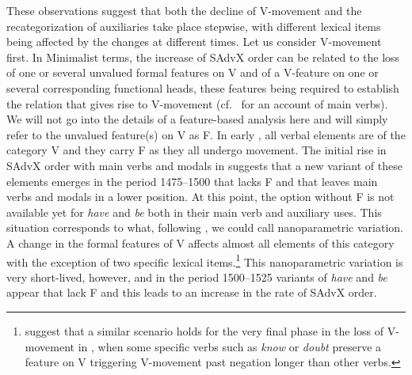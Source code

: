\documentclass[output=paper]{langsci/langscibook}
\begin{document}
These observations suggest that both the decline of V-movement and the
recategorization of auxiliaries take place stepwise, with different lexical
items being affected by the changes at different times. Let us consider
V-movement first. In Minimalist terms, the increase of SAdvX order can be
related to the loss of one or several unvalued formal features on V and of a
V-feature on one or several corresponding functional heads, these features
being required to establish the  relation that gives rise to V-movement
(cf.\ \citealt[528ff.]{HaeIhs2016} for an account of main verbs). We will not go
into the details of a feature-based analysis here and will simply refer to the
unvalued feature(s) on V as F. In early , all verbal elements are of the
category V and they carry F as they all undergo movement.  The initial rise in
SAdvX order with main verbs and modals in  suggests that a
new variant of these elements emerges in the period 1475--1500 that lacks F and
that leaves main verbs and modals in a lower position. At this point, the
option without F is not available yet for \emph{have} and \emph{be} both in
their main verb and auxiliary uses. This situation corresponds to what,
following \textcite{BibRob2012b,BibRob2016}, we could call nanoparametric
variation. A change in the formal features of V affects almost all elements of
this category with the exception of two specific lexical
items.\footnote{\citet{BibRob2012b} suggest that a similar scenario holds for
the very final phase in the loss of V-movement in , when some specific
verbs such as \emph{know} or \emph{doubt} preserve a feature on V triggering
V-movement past negation longer than other verbs.} This nanoparametric
variation is very short-lived, however, and in the period 1500--1525 variants
of \emph{have} and \emph{be} appear that lack F and this leads to an increase
in the rate of SAdvX order.
\end{document}
